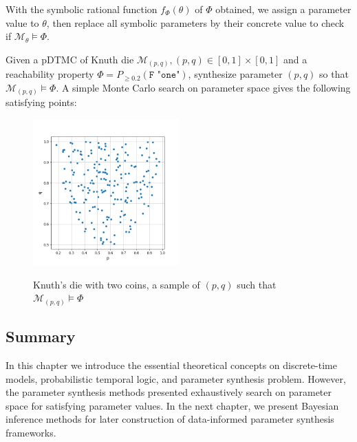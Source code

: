 With the symbolic rational function $f_\Phi(\theta)$ of $\Phi$ obtained, we assign a parameter value
to $\theta$, then replace all symbolic parameters by their concrete value to check if
$\mathcal{M}_\theta \models \Phi$.
\begin{example}
      Given a pDTMC of Knuth die $\mathcal{M}_{(p,q)}, (p,q)\in[0,1]\times[0,1] $ and a reachability
      property $\Phi = P_{\geq 0.2} (\texttt{F "one"})$, synthesize parameter $(p,q)$ so that
      $\mathcal{M}_{(p,q)} \models \Phi$. A simple Monte Carlo search on parameter space gives the
      following satisfying points:
      \begin{figure}[H]
            \centering
            \includegraphics[width=0.5\textwidth]{figures/knuth_die_trueparams.png}
            \label{fig:knuth-die-pq-trueparams}
            \caption{Knuth's die with two coins, a sample of $(p,q)$ such that $\mathcal{M}_{(p,q)} \models \Phi$}
      \end{figure}
\end{example}

\subsection{Summary}
In this chapter we introduce the essential theoretical concepts on discrete-time models,
probabilistic temporal logic, and parameter synthesis problem. However, the parameter synthesis
methods presented exhaustively search on parameter space for satisfying parameter values. In the
next chapter, we present Bayesian inference methods for later construction of data-informed
parameter synthesis frameworks.